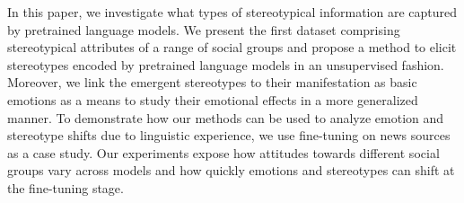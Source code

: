 In this paper, we investigate what types of stereotypical information are captured by pretrained language models. We present the first dataset comprising stereotypical attributes of a range of social groups and propose a method to elicit stereotypes encoded by pretrained language models in an unsupervised fashion. Moreover, we link the emergent stereotypes to their manifestation as basic emotions as a means to study their emotional effects in a more generalized manner. To demonstrate how our methods can be used to analyze emotion and stereotype shifts due to linguistic experience, we use fine-tuning on news sources as a case study. Our experiments expose how attitudes towards different social groups vary across models and how quickly emotions and stereotypes can shift at the fine-tuning stage.
